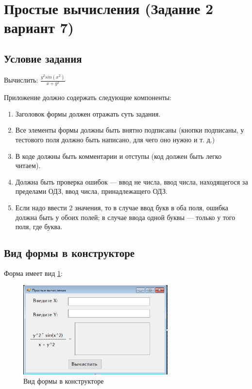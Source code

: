 \section{Простые вычисления (Задание 2 вариант 7)}

\subsection{Условие задания}

Вычислить: $\frac{y^2 sin (x^2)}{x + y^2}$

Приложение должно содержать следующие компоненты:

\begin{enumerate}
    \item{Заголовок формы должен отражать суть задания.}
    \item{Все элементы формы должны быть внятно подписаны (кнопки подписаны, у тестового поля должно быть написано, для чего оно нужно и т. д.)}
    \item{В коде должны быть комментарии и отступы (код должен быть легко читаем).}
    \item{Должна быть проверка ошибок --- ввод не числа, ввод числа, находящегося за пределами ОДЗ, ввод числа, принадлежащего ОДЗ.}
    \item{Если надо ввести 2 значения, то в случае ввод букв в оба поля, ошибка должна быть у обоих полей; в случае ввода одной буквы --- только у того поля, где буква.}
\end{enumerate}

\subsection{Вид формы в конструкторе}

Форма имеет вид \ref{fig:FormInConstruct2}:

\begin{figure}[!h]
    \centering
    \includegraphics[width = 0.7\textwidth]{images/Task2/FormInConstructor.png}
    \caption{Вид формы в конструкторе}
    \label{fig:FormInConstruct2}
\end{figure}

